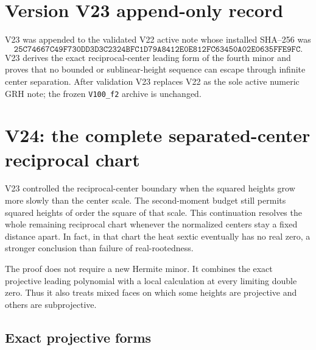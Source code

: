 \documentclass[11pt]{article}
\theoremstyle{definition}
\theoremstyle{remark}
\begin{document}
\section*{Version V23 append-only record}

V23 was appended to the validated V22 active note whose installed
SHA--256 was
\[
 \texttt{25C74667C49F730DD3D3C2324BFC1D79A8412E0E812FC63450A02E0635FFE9FC}.
 \tag{N23.26}
\]
V23 derives the exact reciprocal-center leading form of the fourth minor
and proves that no bounded or sublinear-height sequence can escape through
infinite center separation.  After validation V23 replaces V22 as the
sole active numeric GRH note; the frozen \texttt{V100\_f2} archive is
unchanged.



\section{V24: the complete separated-center reciprocal chart}
\label{sec:f2v24-separated}

V23 controlled the reciprocal-center boundary when the squared heights
grow more slowly than the center scale.  The second-moment budget still
permits squared heights of order the square of that scale.  This
continuation resolves the whole remaining reciprocal chart whenever the
normalized centers stay a fixed distance apart.  In fact, in that chart
the heat sextic eventually has no real zero, a stronger conclusion than
failure of real-rootedness.

The proof does not require a new Hermite minor.  It combines the exact
projective leading polynomial with a local calculation at every limiting
double zero.  Thus it also treats mixed faces on which some heights are
projective and others are subprojective.

\subsection{Exact projective forms}
\label{subsec:f2v24-forms}
\end{document}
